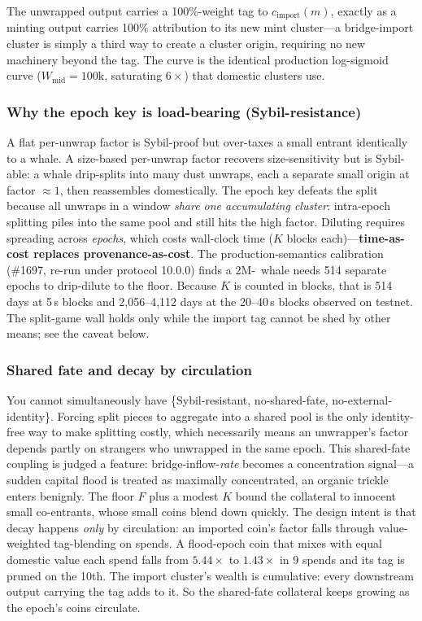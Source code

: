 The unwrapped output carries a 100\%-weight tag to $c_{\mathrm{import}}(m)$,
exactly as a minting output carries 100\% attribution to its new mint
cluster---a bridge-import cluster is simply a third way to create a cluster
origin, requiring no new machinery beyond the tag. The curve is the identical
production log-sigmoid curve ($W_{\mathrm{mid}} = 100\text{k}$, saturating
$6\times$) that domestic clusters use.

\subsubsection{Why the epoch key is load-bearing (Sybil-resistance)}

A flat per-unwrap factor is Sybil-proof but over-taxes a small entrant
identically to a whale. A size-based per-unwrap factor recovers size-sensitivity
but is Sybil-able: a whale drip-splits into many dust unwraps, each a separate
small origin at factor $\approx 1$, then reassembles domestically. The epoch key
defeats the split because all unwraps in a window \emph{share one accumulating
cluster}: intra-epoch splitting piles into the same pool and still hits the high
factor. Diluting requires spreading across \emph{epochs}, which costs wall-clock
time ($K$ blocks each)---\textbf{time-as-cost replaces provenance-as-cost}. The
production-semantics calibration (\#1697, re-run under protocol 10.0.0) finds a
2M-\BTH\ whale needs 514 separate epochs to drip-dilute to the floor. Because
$K$ is counted in blocks, that is 514 days at 5\,s blocks and
2{,}056--4{,}112 days at the 20--40\,s blocks observed on testnet. The split-game wall holds only while the import tag cannot
be shed by other means; see the caveat below.

\subsubsection{Shared fate and decay by circulation}

You cannot simultaneously have \{Sybil-resistant, no-shared-fate,
no-external-identity\}. Forcing split pieces to aggregate into a shared pool is
the only identity-free way to make splitting costly, which necessarily means an
unwrapper's factor depends partly on strangers who unwrapped in the same epoch.
This shared-fate coupling is judged a feature: bridge-inflow-\emph{rate} becomes
a concentration signal---a sudden capital flood is treated as maximally
concentrated, an organic trickle enters benignly. The floor $F$ plus a modest
$K$ bound the collateral to innocent small co-entrants, whose small coins blend
down quickly. The design intent is that decay happens \emph{only} by circulation: an
imported coin's factor falls through value-weighted tag-blending on spends. A
flood-epoch coin that mixes with equal domestic value each spend falls from
$5.44\times$ to $1.43\times$ in 9 spends and its tag is pruned on the 10th. The
import cluster's wealth is cumulative: every downstream output carrying the tag
adds to it. So the shared-fate collateral keeps growing as the epoch's coins
circulate.

